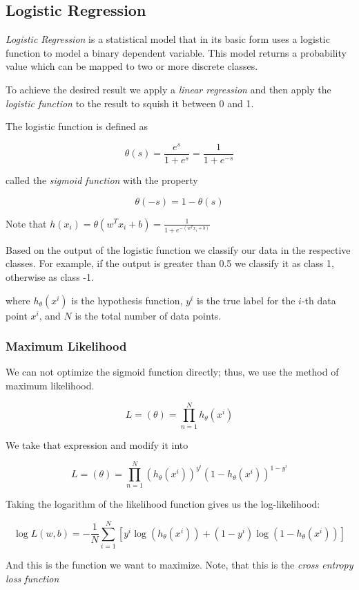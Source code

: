 \subsection{Logistic Regression}

\emph{Logistic Regression} is a statistical model that in its basic form uses a logistic function to model a binary dependent variable.
This model returns a probability value which can be mapped to two or more discrete classes.

To achieve the desired result we apply a \emph{linear regression} and then apply the \emph{logistic function} to the result to 
squish it between 0 and 1.

The logistic function is defined as

\[
    \theta(s) = \frac{e^s}{1 + e^s} = \frac{1}{1 + e^{-s}}
\]

called the \emph{sigmoid function} with the property 

\[
    \theta(-s) = 1 - \theta(s)
\]

Note that \(h(x_i) = \theta(w^T x_i + b) = \frac{1}{1 + e^{- (w^T x_i + b)}}\)

Based on the output of the logistic function we classify our data in the respective classes. For example, if the output is
greater than 0.5 we classify it as class 1, otherwise as class -1.

where \(h_\theta (x^i)\) is the hypothesis function, \(y^i\) is the true label for the \(i\)-th data point \(x^i\), and \(N\) is the total number of data points.

\subsubsection{Maximum Likelihood}

We can not optimize the sigmoid function directly; thus, we use the method of maximum likelihood. 

\[
    L = (\theta) = \prod_{n = 1}^N h_\theta(x^i)
\]

We take that expression and modify it into 

\[
    L = (\theta) = \prod_{n = 1}^N (h_\theta(x^i))^{y^i} (1 - h_\theta(x^i))^{1 - y^i}
\]

Taking the logarithm of the likelihood function gives us the log-likelihood:

\[
    \log L(w,b) = - \frac{1}{N} \sum_{i=1}^{N} [y^i \log(h_\theta (x^i)) + (1 - y^i) \log(1 - h_\theta (x^i))]
\]

And this is the function we want to maximize. Note, that this is the \emph{cross entropy loss function}

